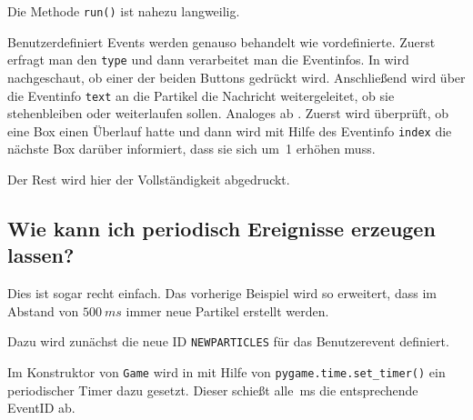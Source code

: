 
Die Methode \texttt{run()} ist nahezu langweilig.


Benutzerdefiniert Events werden genauso behandelt wie vordefinierte. Zuerst erfragt man den \texttt{type} und dann verarbeitet man die Eventinfos. In  wird nachgeschaut, ob einer der beiden Buttons gedrückt wird. Anschließend wird über die Eventinfo \texttt{text} an die Partikel die Nachricht weitergeleitet, ob sie stehenbleiben oder weiterlaufen sollen. Analoges ab . Zuerst wird überprüft, ob eine Box einen Überlauf hatte und dann wird mit Hilfe des Eventinfo \texttt{index} die nächste Box darüber informiert, dass sie sich um~1 erhöhen muss.


Der Rest wird hier der Vollständigkeit abgedruckt.


\subsection{Wie kann ich periodisch Ereignisse erzeugen lassen?}\label{eventtime}

Dies ist sogar recht einfach. Das vorherige Beispiel wird so erweitert, dass im Abstand von $500~ms$ immer neue Partikel erstellt werden.

Dazu wird zunächst die neue ID \texttt{NEWPARTICLES} für das Benutzerevent definiert.


Im Konstruktor von \texttt{Game} wird in  mit Hilfe von \texttt{pygame.time.set\_timer()} ein periodischer Timer dazu gesetzt. Dieser schießt alle~\unit[500]{ms} die entsprechende EventID ab.


